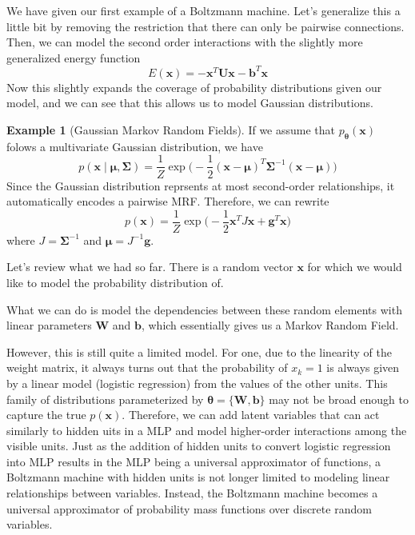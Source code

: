 \documentclass{article}
\theoremstyle{definition}
\newtheorem{example}{Example}[section]
\theoremstyle{remark}
\theoremstyle{definition}
\begin{document}
We have given our first example of a Boltzmann machine. Let's generalize this a little bit by removing the restriction that there can only be pairwise connections. Then, we can model the second order interactions with the slightly more generalized energy function
\[E(\mathbf{x}) = -\mathbf{x}^T \mathbf{U} \mathbf{x} - \mathbf{b}^T \mathbf{x}\]
Now this slightly expands the coverage of probability distributions given our model, and we can see that this allows us to model Gaussian distributions. 

\begin{example}[Gaussian Markov Random Fields] 
    If we assume that $p_{\boldsymbol{\theta}} ( \mathbf{x})$ folows a multivariate Gaussian distribution, we have 
\[p(\mathbf{x} \mid \boldsymbol{\mu}, \boldsymbol{\Sigma}) = \frac{1}{Z} \exp \bigg( -\frac{1}{2} (\mathbf{x} - \boldsymbol{\mu})^T \boldsymbol{\Sigma}^{-1} (\mathbf{x} - \boldsymbol{\mu}) \bigg)\]
Since the Gaussian distribution reprsents at most second-order relationships, it automatically encodes a pairwise MRF. Therefore, we can rewrite 
\[p(\mathbf{x}) = \frac{1}{Z} \exp \bigg( -\frac{1}{2} \mathbf{x}^T J\mathbf{x} + \mathbf{g}^T \mathbf{x} \bigg)\] 
where $J = \boldsymbol{\Sigma}^{-1}$ and $\boldsymbol{\mu} = J^{-1} \mathbf{g}$. 
\end{example}

Let's review what we had so far. There is a random vector $\mathbf{x}$ for which we would like to model the probability distribution of. 

\begin{center}
\end{center}

What we can do is model the dependencies between these random elements with linear parameters $\mathbf{W}$ and $\mathbf{b}$, which essentially gives us a Markov Random Field.  

However, this is still quite a limited model. For one, due to the linearity of the weight matrix, it always turns out that the probability of $x_k = 1$ is always given by a linear model (logistic regression) from the values of the other units. This family of distributions parameterized by $\boldsymbol{\theta} = \{\mathbf{W}, \mathbf{b}\}$ may not be broad enough to capture the true $p(\mathbf{x})$. Therefore, we can add latent variables that can act similarly to hidden uits in a MLP and model higher-order interactions among the visible units. Just as the addition of hidden units to convert logistic regression into MLP results in the MLP being a universal approximator of functions, a Boltzmann machine with hidden units is not longer limited to modeling linear relationships between variables. Instead, the Boltzmann machine becomes a universal approximator of probability mass functions over discrete random variables. 
\end{document}

